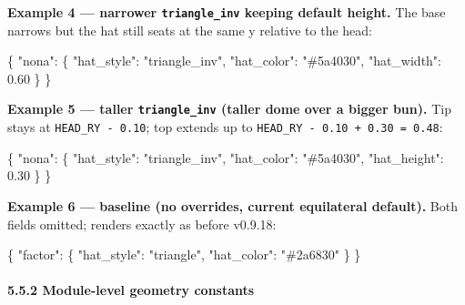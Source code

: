 \documentclass[
  12pt,
  letterpaper,
]{book}
\newenvironment{Shaded}{}{}
\newcommand{\DataTypeTok}[1]{\textcolor[rgb]{0.56,0.13,0.00}{#1}}
\newcommand{\FloatTok}[1]{\textcolor[rgb]{0.25,0.63,0.44}{#1}}
\newcommand{\FunctionTok}[1]{\textcolor[rgb]{0.02,0.16,0.49}{#1}}
\newcommand{\StringTok}[1]{\textcolor[rgb]{0.25,0.44,0.63}{#1}}
\begin{document}
\textbf{Example 4 --- narrower \texttt{triangle\_inv} keeping default
height.} The base narrows but the hat still seats at the same y
relative to the head:

\begin{Shaded}
\begin{Highlighting}[]
\FunctionTok{\{}
  \DataTypeTok{"nona"}\FunctionTok{:} \FunctionTok{\{}
    \DataTypeTok{"hat\_style"}\FunctionTok{:} \StringTok{"triangle\_inv"}\FunctionTok{,}
    \DataTypeTok{"hat\_color"}\FunctionTok{:} \StringTok{"\#5a4030"}\FunctionTok{,}
    \DataTypeTok{"hat\_width"}\FunctionTok{:} \FloatTok{0.60}
  \FunctionTok{\}}
\FunctionTok{\}}
\end{Highlighting}
\end{Shaded}

\textbf{Example 5 --- taller \texttt{triangle\_inv} (taller dome over a
bigger bun).} Tip stays at \texttt{HEAD\_RY\ -\ 0.10}; top extends up
to \texttt{HEAD\_RY\ -\ 0.10\ +\ 0.30\ =\ 0.48}:

\begin{Shaded}
\begin{Highlighting}[]
\FunctionTok{\{}
  \DataTypeTok{"nona"}\FunctionTok{:} \FunctionTok{\{}
    \DataTypeTok{"hat\_style"}\FunctionTok{:}  \StringTok{"triangle\_inv"}\FunctionTok{,}
    \DataTypeTok{"hat\_color"}\FunctionTok{:}  \StringTok{"\#5a4030"}\FunctionTok{,}
    \DataTypeTok{"hat\_height"}\FunctionTok{:} \FloatTok{0.30}
  \FunctionTok{\}}
\FunctionTok{\}}
\end{Highlighting}
\end{Shaded}

\textbf{Example 6 --- baseline (no overrides, current equilateral
default).} Both fields omitted; renders exactly as before v0.9.18:

\begin{Shaded}
\begin{Highlighting}[]
\FunctionTok{\{}
  \DataTypeTok{"factor"}\FunctionTok{:} \FunctionTok{\{}
    \DataTypeTok{"hat\_style"}\FunctionTok{:} \StringTok{"triangle"}\FunctionTok{,}
    \DataTypeTok{"hat\_color"}\FunctionTok{:} \StringTok{"\#2a6830"}
  \FunctionTok{\}}
\FunctionTok{\}}
\end{Highlighting}
\end{Shaded}

\paragraph{5.5.2 Module-level geometry
constants}\label{module-level-geometry-constants}
\end{document}
